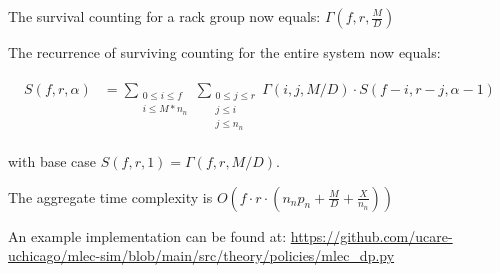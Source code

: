 \documentclass{article}
\begin{document}
The survival counting for a rack group now equals: $\Gamma(f,r,\frac{M}{D})$

The recurrence of surviving counting for the entire system now equals:

\begin{eqnarray}
\begin{aligned}
  S(f,r,\alpha)
  &= \sum_{\substack{0 \leq i \leq f \\ i \leq M*n_n}}
  \sum_{\substack{0 \leq j \leq r \\ j \leq i \\ j \leq n_n}}
  \Gamma(i,j,M/D) \cdot S(f-i, r-j, \alpha-1)
\end{aligned}
\label{eq:mlec_dp:2}
\end{eqnarray}

with base case $S(f,r,1) =  \Gamma(f,r,M/D)$.

The aggregate time complexity is $O(f \cdot r \cdot (n_n p_n + \frac{M}{D} + \frac{X}{n_n}))$

An example implementation can be found at: \url{https://github.com/ucare-uchicago/mlec-sim/blob/main/src/theory/policies/mlec_dp.py}
\end{document}
